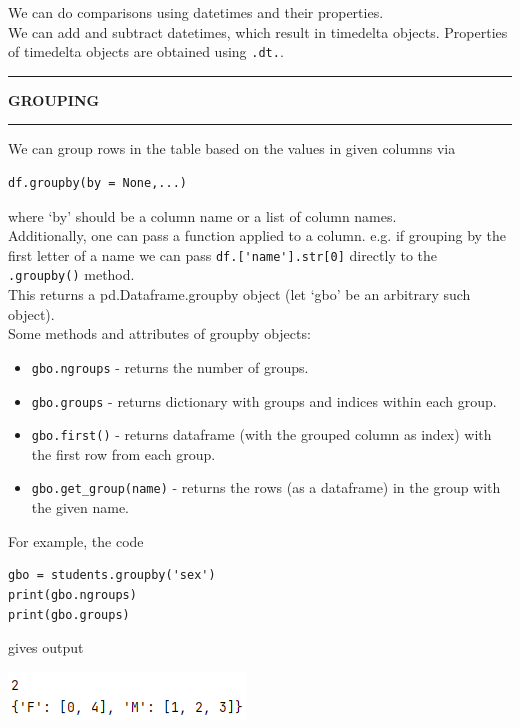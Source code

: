 \documentclass[8pt]{extarticle}
\newcommand{\heading}[1]{%
    \noindent
    \rule{\linewidth}{0.4pt}
    \begin{center}
        \vspace{-1ex}
        \textbf{#1}        
        \vspace{-2.5ex}
    \end{center}
    \rule{\linewidth}{0.4pt}
}
\begin{document}
\begin{multicols}{4}
We can do comparisons using datetimes and their properties.\\ We can add and subtract datetimes, which result in timedelta objects. Properties of timedelta objects are obtained using \lstinline[style=Python]!.dt.!.\\

\heading{GROUPING}

We can group rows in the table based on the values in given columns via
\begin{lstlisting}[style=Python]
df.groupby(by = None,...)
\end{lstlisting}
where `by' should be a column name or a list of column names. \\Additionally, one can pass a function applied to a column. e.g. if grouping by the first letter of a name we can pass \lstinline[style=Python]!df.['name'].str[0]! directly to the \lstinline[style=Python]!.groupby()! method.\\

This returns a pd.Dataframe.groupby object (let `gbo' be an arbitrary such object).\\

Some methods and attributes of groupby objects:

\begin{itemize}
    \item \lstinline[style=Python]!gbo.ngroups! - returns the number of groups.
    \item \lstinline[style=Python]!gbo.groups! - returns dictionary with groups and indices within each group.
    \item \lstinline[style=Python]!gbo.first()! - returns dataframe (with the grouped column as index) with the first row from each group.
    \item \lstinline[style=Python]!gbo.get_group(name)! - returns the rows (as a dataframe) in the group with the given name.
\end{itemize}

For example, the code
\begin{lstlisting}[style=Python]
gbo = students.groupby('sex')
print(gbo.ngroups)
print(gbo.groups)
\end{lstlisting}

gives output 

\includegraphics[scale = 0.7]{images/grouping_eg.png}


\end{multicols}
\end{document}
